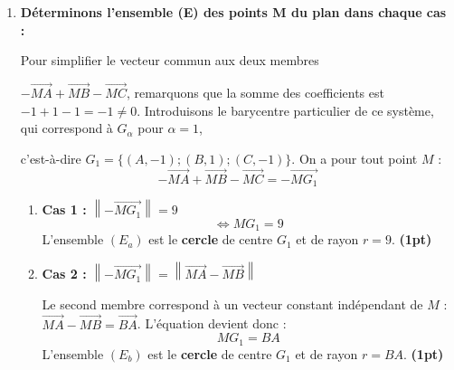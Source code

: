 \documentclass[12pt,a4paper]{article}
\newcommand{\redtitle}[1]{\textcolor{myred}{\textbf{#1}}}
\newcommand{\redbox}[1]{\color{myred}\boxed{#1}\color{black}}
\begin{document}
\begin{enumerate}
    Vérifions si l'énoncé d'origine ne contenait pas une coquille textuelle entre le point $A$ et le point $I$. Puisque $\overrightarrow{AG_1} + \overrightarrow{AG_{-1}} = \overrightarrow{0}$, on en déduit formellement que :
    \[ \redbox{A \text{ est le milieu de } [G_1G_{-1}]} \] \hfill \textbf{(1pt)}

    \item \redtitle{Déterminons l'ensemble (E) des points M du plan dans chaque cas :}
    
    Pour simplifier le vecteur commun aux deux membres
    
     $-\overrightarrow{MA} + \overrightarrow{MB} - \overrightarrow{MC}$, remarquons que la somme des coefficients est $-1 + 1 - 1 = -1 \neq 0$. Introduisons le barycentre particulier de ce système, qui correspond à $G_\alpha$ pour $\alpha = 1$,
     
      c'est-à-dire $G_1 = \{(A, -1); (B, 1); (C, -1)\}$. 
    On a pour tout point $M$ :
    \[ -\overrightarrow{MA} + \overrightarrow{MB} - \overrightarrow{MC} = -\overrightarrow{MG_1} \]
    
    \begin{enumerate}
        \item \textbf{Cas 1 :} $\left\|-\overrightarrow{MG_1}\right\| = 9$
        \[ \iff MG_1 = 9 \]
        L'ensemble $(E_a)$ est le \textbf{cercle} de centre $G_1$ et de rayon $r = 9$. \hfill \textbf{(1pt)}
        
        \item \textbf{Cas 2 :} $\left\|-\overrightarrow{MG_1}\right\| = \left\|\overrightarrow{MA} - \overrightarrow{MB}\right\|$
        
        Le second membre correspond à un vecteur constant indépendant de $M$ : 
        $\overrightarrow{MA} - \overrightarrow{MB} = \overrightarrow{BA}$.
        L'équation devient donc :
        \[ MG_1 = BA \]
        L'ensemble $(E_b)$ est le \textbf{cercle} de centre $G_1$ et de rayon $r = BA$. \hfill \textbf{(1pt)}
    \end{enumerate}

\end{enumerate}
\end{document}

